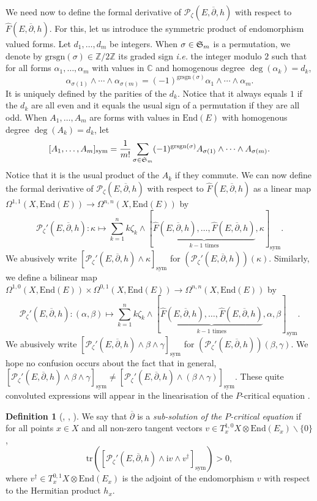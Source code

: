 \documentclass{article}
\theoremstyle{remark}
\theoremstyle{definition}
\newtheorem{definition}[theorem]{Definition}
\newcommand{\Z}{\mathbb{Z}}
\newcommand{\C}{\mathbb{C}}
\newcommand{\End}{\mathrm{End}}
\newcommand{\tr}{\mathrm{tr}}
\renewcommand{\i}{\boldsymbol{\mathrm{i}}}
\newcommand{\mP}{\mathcal{P}}
\newcommand{\dbar}{\overline{\partial}}
\newcommand{\sym}{\mathrm{sym}}
\begin{document}
We need now to define the formal derivative of $\mP_\zeta(E,\dbar,h)$ with respect to $\hat{F}(E,\dbar,h)$. For this, let us introduce the symmetric product of endomorphism valued forms. Let $d_1,\ldots,d_m$ be integers. When $\sigma \in \frak{S}_m$ is a permutation, we denote by $\mathrm{grsgn}(\sigma) \in \Z/2\Z$ its graded sign \textit{i.e.} the integer modulo $2$ such that for all forms $\alpha_1,\ldots,\alpha_m$ with values in $\C$ and homogenous degree $\deg(\alpha_k) = d_k$,
$$
\alpha_{\sigma(1)} \wedge \cdots \wedge \alpha_{\sigma(m)} = (-1)^{\mathrm{grsgn}(\sigma)}\alpha_1 \wedge \cdots \wedge \alpha_m.
$$
It is uniquely defined by the parities of the $d_k$. Notice that it always equals $1$ if the $d_k$ are all even and it equals the usual sign of a permutation if they are all odd. When $A_1,\ldots,A_m$ are forms with values in $\End(E)$ with homogenous degree $\deg(A_k) = d_k$, let
$$
[A_1,\ldots,A_m]_\sym = \frac{1}{m!}\sum_{\sigma \in \frak{S}_m} (-1)^{\mathrm{grsgn}(\sigma)}A_{\sigma(1)} \wedge \cdots \wedge A_{\sigma(m)}.
$$
Notice that it is the usual product of the $A_k$ if they commute. We can now define the formal derivative of $\mP_\zeta(E,\dbar,h)$ with respect to $\hat{F}(E,\dbar,h)$ as a linear map $\Omega^{1,1}(X,\End(E)) \rightarrow \Omega^{n,n}(X,\End(E))$ by
$$
\mP_\zeta'(E,\dbar,h) : \kappa \mapsto \sum_{k = 1}^n k\zeta_k \wedge [\underbrace{\hat{F}(E,\dbar,h),\ldots,\hat{F}(E,\dbar,h)}_{k - 1 \textrm{ times}},\kappa]_\sym.
$$
We abusively write $[\mP_\zeta'(E,\dbar,h) \wedge \kappa]_\sym$ for $(\mP_\zeta'(E,\dbar,h))(\kappa)$. Similarly, we define a bilinear map\\
$\Omega^{1,0}(X,\End(E)) \times \Omega^{0,1}(X,\End(E)) \rightarrow \Omega^{n,n}(X,\End(E))$ by
$$
\mP_\zeta'(E,\dbar,h) : (\alpha,\beta) \mapsto \sum_{k = 1}^n k\zeta_k \wedge [\underbrace{\hat{F}(E,\dbar,h),\ldots,\hat{F}(E,\dbar,h)}_{k - 1 \textrm{ times}},\alpha,\beta]_\sym.
$$
We abusively write $[\mP_\zeta'(E,\dbar,h) \wedge \beta \wedge \gamma]_\sym$ for $(\mP_\zeta'(E,\dbar,h))(\beta,\gamma)$. We hope no confusion occurs about the fact that in general, $[\mP_\zeta'(E,\dbar,h) \wedge \beta \wedge \gamma]_\sym \neq [\mP_\zeta'(E,\dbar,h) \wedge (\beta \wedge \gamma)]_\sym$. These quite convoluted expressions will appear in the linearisation of the $P$-critical equation \cite[Section 2.3.1]{DMS}.

\begin{definition}[{\cite[Definition 2.35]{DMS}, \cite[Definition 2.6]{Keller_Scarpa}, \cite[Definition 2.1]{DNST}}]\label{DEF:Sous-solution P}
    We say that $\dbar$ is a \textit{sub-solution of the $P$-critical equation} if for all points $x \in X$ and all non-zero tangent vectors $v \in T_x^{1,0}X \otimes \End(E_x)\backslash\{0\}$,
    $$
    \tr([\mP_\zeta'(E,\dbar,h) \wedge \i v \wedge v^\dagger]_\sym) > 0,
    $$
    where $v^\dagger \in T_x^{0,1}X \otimes \End(E_x)$ is the adjoint of the endomorphism $v$ with respect to the Hermitian product $h_x$.
\end{definition}
\end{document}
